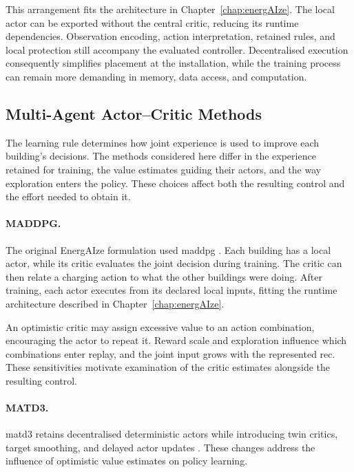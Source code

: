 This arrangement fits the architecture in Chapter~\ref{chap:energAIze}. The local actor can be exported without the central critic, reducing its runtime dependencies. Observation encoding, action interpretation, retained rules, and local protection still accompany the evaluated controller. Decentralised execution consequently simplifies placement at the installation, while the training process can remain more demanding in memory, data access, and computation.

\subsection{Multi-Agent Actor--Critic Methods}
\label{sec:control-actor-critic-methods}

The learning rule determines how joint experience is used to improve each building's decisions. The methods considered here differ in the experience retained for training, the value estimates guiding their actors, and the way exploration enters the policy. These choices affect both the resulting control and the effort needed to obtain it.

\paragraph{MADDPG.}
The original EnergAIze formulation used \gls{maddpg} \parencite{lowe2017maddpg,fonseca2024energAIze}. Each building has a local actor, while its critic evaluates the joint decision during training. The critic can then relate a charging action to what the other buildings were doing. After training, each actor executes from its declared local inputs, fitting the runtime architecture described in Chapter~\ref{chap:energAIze}.

An optimistic critic may assign excessive value to an action combination, encouraging the actor to repeat it. Reward scale and exploration influence which combinations enter replay, and the joint input grows with the represented \gls{rec}. These sensitivities motivate examination of the critic estimates alongside the resulting control.

\paragraph{MATD3.}
\gls{matd3} retains decentralised deterministic actors while introducing twin critics, target smoothing, and delayed actor updates \parencite{ackermann2019matd3}. These changes address the influence of optimistic value estimates on policy learning.

